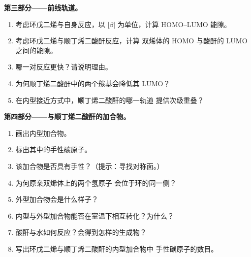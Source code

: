 \begin{problem}
\medskip
\noindent\textbf{第三部分——前线轨道。}
\begin{enumerate}[resume]
  \item 考虑环戊二烯与自身反应，以
        $|\beta|$ 为单位，计算 HOMO--LUMO 能隙。
  \item 考虑环戊二烯与顺丁烯二酸酐反应，计算
        双烯体的 HOMO 与酸酐的 LUMO 之间的能隙。
  \item 哪一对反应更快？请说明理由。
  \item 为何顺丁烯二酸酐中的两个羰基会降低其 LUMO？
  \item 在内型接近方式中，顺丁烯二酸酐的哪一轨道
        提供次级重叠？
\end{enumerate}

\medskip
\noindent\textbf{第四部分——与顺丁烯二酸酐的加合物。}
\begin{enumerate}[resume]
  \item 画出内型加合物。
  \item 标出其中的手性碳原子。
  \item 该加合物是否具有手性？（提示：寻找对称面。）
  \item 为何原亲双烯体上的两个氢原子
        会位于环的同一侧？
  \item 外型加合物会是什么样子？
  \item 内型与外型加合物能否在室温下相互转化？为什么？
  \item 酸酐与水如何反应？会得到怎样的生成物？
  \item 写出环戊二烯与顺丁烯二酸酐的内型加合物中
        手性碳原子的数目。
\end{enumerate}
\end{problem}
